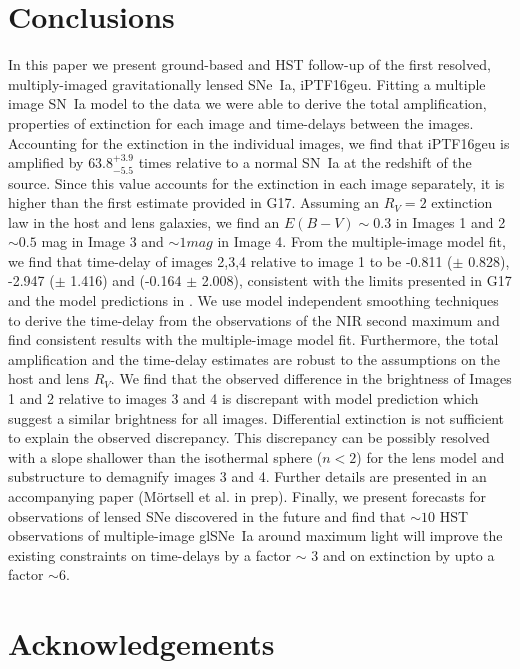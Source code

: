 \documentclass[a4paper,fleqn,usenatbib]{mnras}
\begin{document}
\section{Conclusions}
\label{sec:conclusion}
In this paper we present ground-based and HST follow-up of the first resolved, multiply-imaged gravitationally lensed SNe~Ia, iPTF16geu. Fitting a multiple image SN~Ia model to the data we were able to derive the total amplification, properties of extinction for each image and time-delays between the images. Accounting for the extinction in the individual images, we find that iPTF16geu is amplified by $63.8^{+3.9}_{-5.5}$ times relative to a normal SN~Ia at the redshift of the source. Since this value accounts for the extinction in each image separately, it is higher than the first estimate provided in G17. Assuming an $R_V =2$ extinction law in the host and lens galaxies, we find an $E(B-V) \sim 0.3$ in Images 1 and 2 $\sim 0.5$ mag in Image 3 and $\sim 1 mag$ in Image 4. 
From the multiple-image model fit, we find that time-delay of images 2,3,4 relative to image 1 to be -0.811 ($\pm$ 0.828), -2.947 ($\pm$ 1.416) and (-0.164 $\pm$ 2.008), consistent with the limits presented in G17 and the model predictions in \citep{2017ApJ...835L..25M}. We use model independent smoothing techniques to derive the time-delay from the observations of the NIR second maximum and find consistent results with the multiple-image model fit. Furthermore, the total amplification and the time-delay estimates are robust to the assumptions on the host and lens $R_V$. 
We find that the observed difference in the brightness of Images 1 and 2 relative to images 3 and 4 is discrepant with model prediction which suggest a similar brightness for all images. Differential extinction is not sufficient to explain the observed discrepancy. This discrepancy can be possibly resolved with a slope shallower than the isothermal sphere ($n < 2$) for the lens model and substructure to demagnify images 3 and 4. Further details are presented in an accompanying paper (M{\"o}rtsell et al. in prep). Finally, we present forecasts for observations of lensed SNe discovered in the future and find that $\sim 10$ HST observations of multiple-image glSNe~Ia around maximum light will improve the existing constraints on time-delays by a factor $\sim$ 3 and on extinction by upto a factor $\sim 6$.   

\section*{Acknowledgements}
\end{document}
